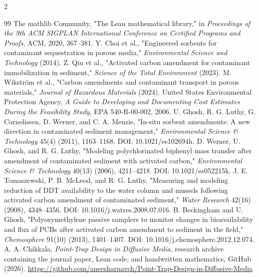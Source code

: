 \documentclass[10pt]{article}
\begin{document}
\begin{multicols}{2}
\begin{thebibliography}{99}
 The mathlib Community, "The Lean mathematical library," in \emph{Proceedings of the 9th ACM SIGPLAN International Conference on Certified Programs and Proofs}, ACM, 2020, 367--381.
 Y. Choi et al., "Engineered sorbents for contaminant sequestration in porous media," \emph{Environmental Science and Technology} (2014).
 Z. Qiu et al., "Activated carbon amendment for contaminant immobilization in sediment," \emph{Science of the Total Environment} (2023).
 M. Wikstr{\"o}m et al., "Carbon amendments and contaminant transport in porous materials," \emph{Journal of Hazardous Materials} (2024).
 United States Environmental Protection Agency, \emph{A Guide to Developing and Documenting Cost Estimates During the Feasibility Study}, EPA 540-R-00-002, 2006.
 U. Ghosh, R. G. Luthy, G. Cornelissen, D. Werner, and C. A. Menzie, "In-situ sorbent amendments: A new direction in contaminated sediment management," \emph{Environmental Science \& Technology} 45(4) (2011), 1163--1168. DOI: 10.1021/es102694h.
 D. Werner, U. Ghosh, and R. G. Luthy, "Modeling polychlorinated biphenyl mass transfer after amendment of contaminated sediment with activated carbon," \emph{Environmental Science \& Technology} 40(13) (2006), 4211--4218. DOI: 10.1021/es052215k.
 J. E. Tomaszewski, P. B. McLeod, and R. G. Luthy, "Measuring and modeling reduction of DDT availability to the water column and mussels following activated carbon amendment of contaminated sediment," \emph{Water Research} 42(16) (2008), 4348--4356. DOI: 10.1016/j.watres.2008.07.016.
 B. Beckingham and U. Ghosh, "Polyoxymethylene passive samplers to monitor changes in bioavailability and flux of PCBs after activated carbon amendment to sediment in the field," \emph{Chemosphere} 91(10) (2013), 1401--1407. DOI: 10.1016/j.chemosphere.2012.12.074.
 A. A. Chikkala, \emph{Point-Trap Design in Diffusive Media}, research archive containing the journal paper, Lean code, and handwritten mathematics, GitHub (2026). \url{https://github.com/aneesharnavch/Point-Trap-Design-in-Diffusive-Media}
\end{thebibliography}
\end{multicols}
\end{document}
